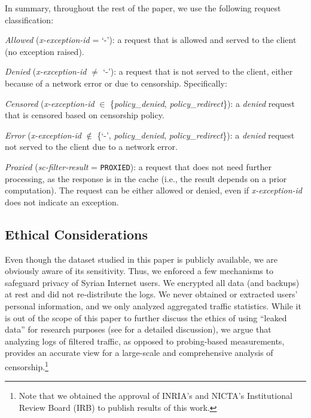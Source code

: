 \documentclass{sig-alternate-2013}
\newcommand{\policydenied}{\emph{policy\_denied}\xspace}
\begin{document}
In summary, throughout the rest of the paper, we use the following request classification:
\begin{compactitem} 
\item \textit{Allowed} (\emph{x-exception-id} = `-'): a request that is allowed and served to the client (no exception raised).
\item \textit{Denied} (\emph{x-exception-id} $\neq$ `-'): a request that is not served to the client, either because of a network error or due to censorship. Specifically:
\begin{compactitem}
	\item \textit{Censored} (\emph{x-exception-id} $\in$ \{\policydenied, \emph{policy\_redirect}\}): a \emph{denied} request that is censored based on censorship policy.
	\item \textit{Error} (\emph{x-exception-id} $\not\in$ \{`-', \policydenied, \emph{policy\_redirect}\}): a \emph{denied} request not served to the client due to a network error.
\end{compactitem}	
\item \textit{Proxied} (\emph{sc-filter-result} = \texttt{PROXIED}): a request that  does not need further processing, as  the response is in the cache (i.e., the result depends on a prior computation). The request can be either allowed or denied, even if \emph{x-exception-id} does not indicate an exception. 
\end{compactitem}






\subsection{Ethical Considerations}\label{subsec:ethics}

Even though the dataset studied in this paper is publicly available, we are obviously aware of its sensitivity. Thus, we enforced a few mechanisms to safeguard  privacy of Syrian Internet users. We encrypted all data (and backups) at rest and did not re-distribute the logs. We never obtained or extracted users' personal information, and we only analyzed aggregated traffic statistics.
While it is out of the scope of this paper to further discuss the ethics of using ``leaked data'' for research purposes (see \cite{bonneau} for a detailed discussion), we argue that analyzing logs of filtered traffic, as opposed to probing-based measurements, provides an accurate view for a large-scale and comprehensive analysis of censorship.\footnote{Note that we obtained the approval of INRIA's and NICTA's Institutional Review Board (IRB) to publish results of this work.}
\end{document}
